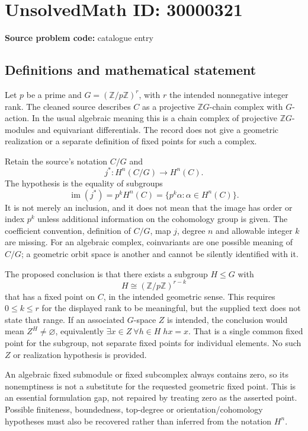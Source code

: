 \documentclass[11pt]{article}
\newcommand{\Z}{\mathbb{Z}}
\begin{document}
\section*{UnsolvedMath ID: 30000321}
\textbf{Source problem code:} catalogue entry
\subsection{Definitions and mathematical statement}
Let \(p\) be a prime and \(G=(\Z/p\Z)^r\), with \(r\) the intended nonnegative integer rank. The cleaned source describes \(C\) as a projective \(\Z G\)-chain complex with \(G\)-action. In the usual algebraic meaning this is a chain complex of projective \(\Z G\)-modules and equivariant differentials. The record does not give a geometric realization or a separate definition of fixed points for such a complex.

Retain the source's notation \(C/G\) and
\[
 j^*:H^n(C/G)\longrightarrow H^n(C).
\]
The hypothesis is the equality of subgroups
\[
 \operatorname{im}(j^*)=p^kH^n(C)
 =\{p^k\alpha:\alpha\in H^n(C)\}.
\]
It is not merely an inclusion, and it does not mean that the image has order or index \(p^k\) unless additional information on the cohomology group is given. The coefficient convention, definition of \(C/G\), map \(j\), degree \(n\) and allowable integer \(k\) are missing. For an algebraic complex, coinvariants are one possible meaning of \(C/G\); a geometric orbit space is another and cannot be silently identified with it.

The proposed conclusion is that there exists a subgroup \(H\leq G\) with
\[
 H\cong(\Z/p\Z)^{r-k}
\]
that has a fixed point on \(C\), in the intended geometric sense. This requires \(0\leq k\leq r\) for the displayed rank to be meaningful, but the supplied text does not state that range. If an associated \(G\)-space \(Z\) is intended, the conclusion would mean \(Z^H\ne\varnothing\), equivalently \(\exists x\in Z\ \forall h\in H\;hx=x\). That is a single common fixed point for the subgroup, not separate fixed points for individual elements. No such \(Z\) or realization hypothesis is provided.

An algebraic fixed submodule or fixed subcomplex always contains zero, so its nonemptiness is not a substitute for the requested geometric fixed point. This is an essential formulation gap, not repaired by treating zero as the asserted point. Possible finiteness, boundedness, top-degree or orientation/cohomology hypotheses must also be recovered rather than inferred from the notation \(H^n\).
\end{document}
